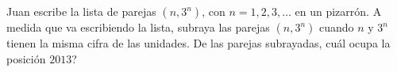 Juan escribe la lista de parejas $(n,3^n)$, con $n=1,2,3,\ldots$ en un pizarrón. A medida que va escribiendo la lista, subraya las parejas $(n,3^n)$ cuando $n$ y $3^n$ tienen la misma cifra de las unidades. De las parejas subrayadas, cuál ocupa la posición $2013$?
